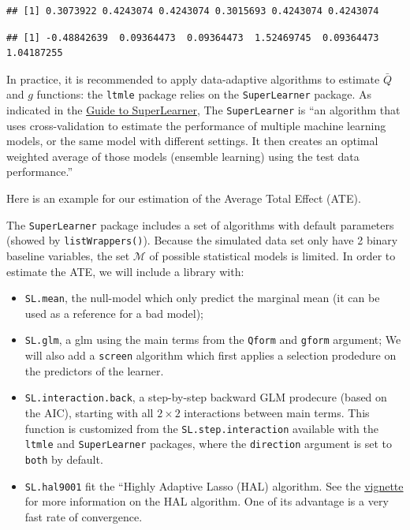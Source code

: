 \documentclass[
]{book}
\newenvironment{Shaded}{\begin{snugshade}}{\end{snugshade}}
\newcommand{\CommentTok}[1]{\textcolor[rgb]{0.56,0.35,0.01}{\textit{#1}}}
\newcommand{\FunctionTok}[1]{\textcolor[rgb]{0.13,0.29,0.53}{\textbf{#1}}}
\newcommand{\NormalTok}[1]{#1}
\newcommand{\SpecialCharTok}[1]{\textcolor[rgb]{0.81,0.36,0.00}{\textbf{#1}}}
\providecommand{\tightlist}{%
  \setlength{\itemsep}{0pt}\setlength{\parskip}{0pt}}
\begin{document}
\begin{verbatim}
## [1] 0.3073922 0.4243074 0.4243074 0.3015693 0.4243074 0.4243074
\end{verbatim}

\begin{Shaded}
\end{Shaded}

\begin{verbatim}
## [1] -0.48842639  0.09364473  0.09364473  1.52469745  0.09364473  1.04187255
\end{verbatim}

In practice, it is recommended to apply data-adaptive algorithms to estimate \(\bar{Q}\) and \(g\) functions: the \texttt{ltmle} package relies on the \texttt{SuperLearner} package. As indicated in the \href{https://cran.r-project.org/web/packages/SuperLearner/vignettes/Guide-to-SuperLearner.html}{Guide to SuperLearner},
The \texttt{SuperLearner} is ``an algorithm that uses cross-validation to estimate the performance of multiple machine learning models, or the same model with different settings. It then creates an optimal weighted average of those models (ensemble learning) using the test data performance.''

Here is an example for our estimation of the Average Total Effect (ATE).

The \texttt{SuperLearner} package includes a set of algorithms with default parameters (showed by \texttt{listWrappers()}). Because the simulated data set only have 2 binary baseline variables, the set \(\mathcal{M}\) of possible statistical models is limited. In order to estimate the ATE, we will include a library with:

\begin{itemize}
\tightlist
\item
  \texttt{SL.mean}, the null-model which only predict the marginal mean (it can be used as a reference for a bad model);
\item
  \texttt{SL.glm}, a glm using the main terms from the \texttt{Qform} and \texttt{gform} argument; We will also add a \texttt{screen} algorithm which first applies a selection prodedure on the predictors of the learner.
\item
  \texttt{SL.interaction.back}, a step-by-step backward GLM prodecure (based on the AIC), starting with all \(2 \times 2\) interactions between main terms. This function is customized from the \texttt{SL.step.interaction} available with the \texttt{ltmle} and \texttt{SuperLearner} packages, where the \texttt{direction} argument is set to \texttt{both} by default.
\item
  \texttt{SL.hal9001} fit the ``Highly Adaptive Lasso (HAL) algorithm. See the \href{https://cran.r-project.org/web//packages/hal9001/vignettes/intro_hal9001.html}{vignette} for more information on the HAL algorithm. One of its advantage is a very fast rate of convergence.
\end{itemize}
\end{document}

